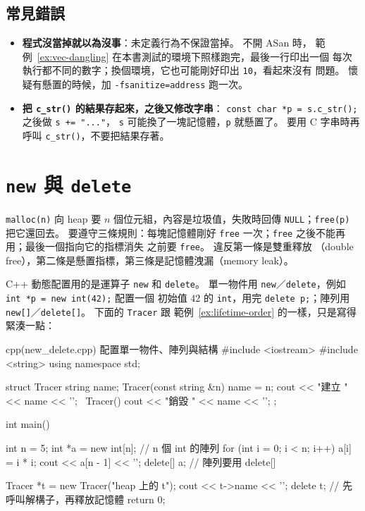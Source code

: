 \subsection{常見錯誤}

\begin{itemize}
\item \textbf{程式沒當掉就以為沒事}：未定義行為不保證當掉。 不開 ASan 時，
範例~\ref{ex:vec-dangling} 在本書測試的環境下照樣跑完，最後一行印出一個
每次執行都不同的數字；換個環境，它也可能剛好印出 \texttt{10}，看起來沒有
問題。 懷疑有懸置的時候，加 \texttt{-fsanitize=address} 跑一次。
\item \textbf{把 \texttt{c\_str()} 的結果存起來，之後又修改字串}：
\texttt{const char *p = s.c\_str();} 之後做 \texttt{s += "..."}，
\texttt{s} 可能換了一塊記憶體，\texttt{p} 就懸置了。 要用 C 字串時再呼叫
\texttt{c\_str()}，不要把結果存著。
\end{itemize}

\section{\texttt{new} 與 \texttt{delete}}
\label{sec:new-delete}

\begin{crecap}
\texttt{malloc(n)} 向 heap 要 $n$ 個位元組，內容是垃圾值，失敗時回傳
\texttt{NULL}；\texttt{free(p)} 把它還回去。 要遵守三條規則：每塊記憶體剛好
\texttt{free} 一次；\texttt{free} 之後不能再用；最後一個指向它的指標消失
之前要 \texttt{free}。 違反第一條是雙重釋放
（double free），第二條是懸置指標，第三條是記憶體洩漏（memory leak）。
\end{crecap}

C++ 動態配置用的是運算子 \texttt{new} 和 \texttt{delete}。 單一物件用
\texttt{new}／\texttt{delete}，例如 \texttt{int *p = new int(42);} 配置一個
初始值 $42$ 的 \texttt{int}，用完 \texttt{delete p;}；陣列用
\texttt{new[]}／\texttt{delete[]}。 下面的 \texttt{Tracer} 跟
範例~\ref{ex:lifetime-order} 的一樣，只是寫得緊湊一點：

\begin{example}[label=ex:new-delete]{cpp}{(new\_delete.cpp) 配置單一物件、陣列與結構}
#include <iostream>
#include <string>
using namespace std;

struct Tracer {
    string name;
    Tracer(const string &n) { name = n; cout << "建立 " << name << '\n'; }
    ~Tracer() { cout << "銷毀 " << name << '\n'; }
};

int main() {
    int n = 5;
    int *a = new int[n];           // n 個 int 的陣列
    for (int i = 0; i < n; i++) {
        a[i] = i * i;
    }
    cout << a[n - 1] << '\n';
    delete[] a;                    // 陣列要用 delete[]

    Tracer *t = new Tracer("heap 上的 t");
    cout << t->name << '\n';
    delete t;                      // 先呼叫解構子，再釋放記憶體
    return 0;
}
\end{example}

